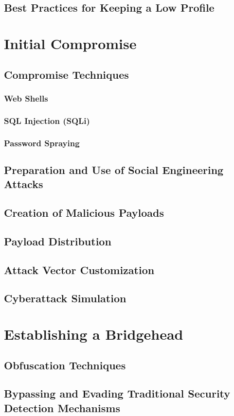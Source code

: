 \documentclass{article}
\begin{document}
\subsection{Best Practices for Keeping a Low Profile}
\section{Initial Compromise}
\subsection{Compromise Techniques}
\subsubsection{Web Shells}
\subsubsection{SQL Injection (SQLi)}
\subsubsection{Password Spraying}
\subsection{Preparation and Use of Social Engineering Attacks}
\subsection{Creation of Malicious Payloads}
\subsection{Payload Distribution}
\subsection{Attack Vector Customization}
\subsection{Cyberattack Simulation}
\section{Establishing a Bridgehead}
\subsection{Obfuscation Techniques}
\subsection{Bypassing and Evading Traditional Security Detection Mechanisms}
\end{document}
